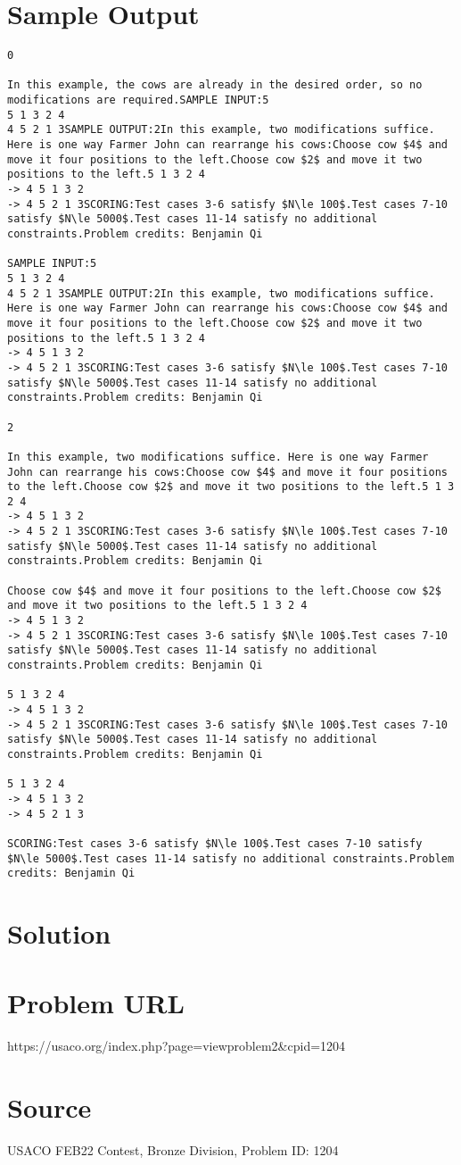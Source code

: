 \documentclass[12pt]{article}
\begin{document}
\section*{Sample Output}
\begin{verbatim}
0

In this example, the cows are already in the desired order, so no modifications are required.SAMPLE INPUT:5
5 1 3 2 4
4 5 2 1 3SAMPLE OUTPUT:2In this example, two modifications suffice. Here is one way Farmer John can rearrange his cows:Choose cow $4$ and move it four positions to the left.Choose cow $2$ and move it two positions to the left.5 1 3 2 4
-> 4 5 1 3 2
-> 4 5 2 1 3SCORING:Test cases 3-6 satisfy $N\le 100$.Test cases 7-10 satisfy $N\le 5000$.Test cases 11-14 satisfy no additional constraints.Problem credits: Benjamin Qi

SAMPLE INPUT:5
5 1 3 2 4
4 5 2 1 3SAMPLE OUTPUT:2In this example, two modifications suffice. Here is one way Farmer John can rearrange his cows:Choose cow $4$ and move it four positions to the left.Choose cow $2$ and move it two positions to the left.5 1 3 2 4
-> 4 5 1 3 2
-> 4 5 2 1 3SCORING:Test cases 3-6 satisfy $N\le 100$.Test cases 7-10 satisfy $N\le 5000$.Test cases 11-14 satisfy no additional constraints.Problem credits: Benjamin Qi

2

In this example, two modifications suffice. Here is one way Farmer John can rearrange his cows:Choose cow $4$ and move it four positions to the left.Choose cow $2$ and move it two positions to the left.5 1 3 2 4
-> 4 5 1 3 2
-> 4 5 2 1 3SCORING:Test cases 3-6 satisfy $N\le 100$.Test cases 7-10 satisfy $N\le 5000$.Test cases 11-14 satisfy no additional constraints.Problem credits: Benjamin Qi

Choose cow $4$ and move it four positions to the left.Choose cow $2$ and move it two positions to the left.5 1 3 2 4
-> 4 5 1 3 2
-> 4 5 2 1 3SCORING:Test cases 3-6 satisfy $N\le 100$.Test cases 7-10 satisfy $N\le 5000$.Test cases 11-14 satisfy no additional constraints.Problem credits: Benjamin Qi

5 1 3 2 4
-> 4 5 1 3 2
-> 4 5 2 1 3SCORING:Test cases 3-6 satisfy $N\le 100$.Test cases 7-10 satisfy $N\le 5000$.Test cases 11-14 satisfy no additional constraints.Problem credits: Benjamin Qi

5 1 3 2 4
-> 4 5 1 3 2
-> 4 5 2 1 3

SCORING:Test cases 3-6 satisfy $N\le 100$.Test cases 7-10 satisfy $N\le 5000$.Test cases 11-14 satisfy no additional constraints.Problem credits: Benjamin Qi
\end{verbatim}

\section*{Solution}


\section*{Problem URL}
https://usaco.org/index.php?page=viewproblem2&cpid=1204

\section*{Source}
USACO FEB22 Contest, Bronze Division, Problem ID: 1204
\end{document}
